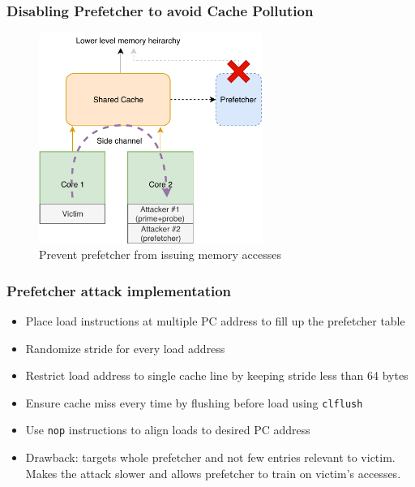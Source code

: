 \documentclass[10pt,usenames,dvipsnames]{beamer}
\begin{document}
\begin{frame}
\frametitle{Disabling Prefetcher to avoid Cache Pollution}
\begin{figure}[ht]
    \centering
    \includegraphics[width=0.65\textwidth]{prefetch_attack}
    \caption{Prevent prefetcher from issuing memory accesses}
    \label{fig:prefetch_attack}
\end{figure}
\end{frame}


\begin{frame}
\frametitle{Prefetcher attack implementation}
\begin{itemize}
    \item Place load instructions at multiple PC address to fill up the prefetcher table
    \item Randomize stride for every load address
    \item Restrict load address to single cache line by keeping stride less than 64 bytes
    \item Ensure cache miss every time by flushing before load using \texttt{clflush}
    \item Use \texttt{nop} instructions to align loads to desired PC address
    \vspace{2em}
    \item Drawback: targets whole prefetcher and not few entries relevant to victim.
        Makes the attack slower and allows prefetcher to train on victim's accesses.
\end{itemize}
\end{frame}
\end{document}
